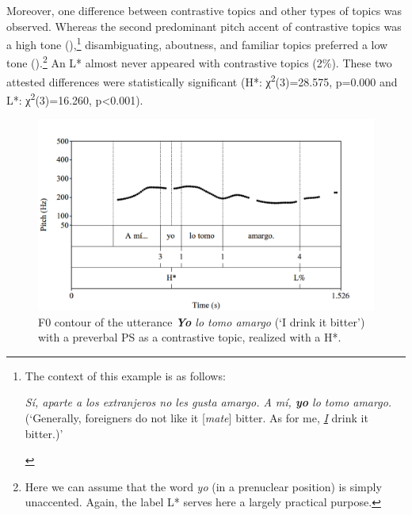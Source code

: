 \documentclass[output=paper]{langsci/langscibook}
\begin{document}
  



Moreover, one difference between contrastive topics and other types of topics was observed. Whereas the second predominant pitch accent of contrastive topics was a high tone (),\footnote{The context of this example is as follows:
\begin{exe}
 \textit{Sí, aparte a los extranjeros no les gusta amargo. A mí, \textbf{yo} lo tomo amargo.}\\
(‘Generally, foreigners do not like it {[}\textit{mate}{]} bitter. As for me, \textit{\uline{I}} drink it bitter.)’
\end{exe}\vspace*{-\baselineskip}} disambiguating, aboutness, and familiar topics preferred a low tone ().\footnote{Here we can assume that the word \textit{yo} (in a prenuclear position) is simply unaccented. Again, the label L* serves here a largely practical purpose.} An L* almost never appeared with contrastive topics (2\%). These two attested differences were statistically significant (H*: χ\textsuperscript{2}(3)=28.575, p=0.000 and L*: χ\textsuperscript{2}(3)=16.260, p<0.001).

\begin{figure}
\includegraphics[width=\textwidth]{figures/pes-img17.png}
\caption{F0 contour of the utterance \textit{\textbf{Yo} lo tomo amargo} (‘I drink it bitter’) with a preverbal PS as a contrastive topic, realized with a H*.\label{fig:pes:17}}
 \end{figure} 
\end{document}
